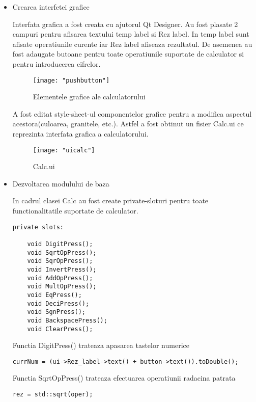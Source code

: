 \begin{itemize}
	\item Crearea interfetei grafice
	
	Interfata grafica a fost creata cu ajutorul Qt Designer. Au fost plasate 2 campuri pentru afisarea textului temp label si Rez label. In temp label sunt afisate operatiunile curente iar Rez label afiseaza rezultatul. De asemenea au fost adaugate butoane pentru toate operatiunile suportate de calculator si pentru introducerea cifrelor.
		\begin{figure}[h!]
			\centering
 			 \texttt{[image: "pushbutton"]}
 			 \caption{Elementele grafice ale calculatorului}
 			 \label{fig:GUI element}
		\end{figure}	
	
	A fost editat style-sheet-ul componentelor grafice pentru a modifica aspectul acestora(culoarea, granitele, etc.). Astfel a fost obtinut un fisier Calc.ui ce reprezinta interfata grafica a calculatorului.
	
	\begin{figure}[h!]
			\centering
 			 \texttt{[image: "uicalc"]}
 			 \caption{Calc.ui}
 			 \label{fig:Calcui}
		\end{figure}
	
	\newpage
	\item Dezvoltarea modulului de baza
	
In cadrul clasei Calc au fost create private-sloturi pentru toate functionalitatile suportate de calculator.
\begin{lstlisting}
private slots:

    void DigitPress();
    void SqrtOpPress();
    void SqrOpPress();
    void InvertPress();
    void AddOpPress();
    void MultOpPress();
    void EqPress();
    void DeciPress();
    void SgnPress();
    void BackspacePress();
    void ClearPress();
\end{lstlisting}

Functia DigitPress() trateaza apasarea tastelor numerice

\begin{lstlisting}
currNum = (ui->Rez_label->text() + button->text()).toDouble();
\end{lstlisting}

Functia SqrtOpPress() trateaza efectuarea operatiunii radacina patrata

\begin{lstlisting}
rez = std::sqrt(oper);
\end{lstlisting}


\end{itemize}
